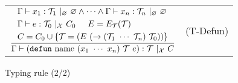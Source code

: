 \documentclass{article}
\begin{document}
\begin{figure}[tb]
\begin{tabular}{rlrl}
        \multicolumn{3}{r}{
            $\dfrac{
                \begin{aligned}
                    &\Gamma \vdash x_1 : \mathcal{T}_1\ |_\varnothing\ \varnothing \land \cdots \land \Gamma \vdash x_n : \mathcal{T}_n\ |_\varnothing\ \varnothing \\
                    &\Gamma \vdash e : \mathcal{T}_0\ |_{\mathcal{X}}\ C_0 \hspace{5mm} E = E_\mathcal{T}(\mathcal{T}) \\
                    &C = C_0 \cup \{\mathcal{T} = (E\ (\rightarrow (\mathcal{T}_1\ \cdots\ \mathcal{T}_n)\ \mathcal{T}_0)) \}
                \end{aligned}
            }{
                \Gamma \vdash (\mathtt{defun}\ \mathrm{name}\ (x_1\ \cdots\ x_n)\ \mathcal{T}\ e) : \mathcal{T}\ |_\mathcal{X}\ C
            }$
        } & (T-Defun)
    \end{tabular}
    \caption{Typing rule (2/2)}
    \label{fig:typing2}
\end{figure}
\end{document}
